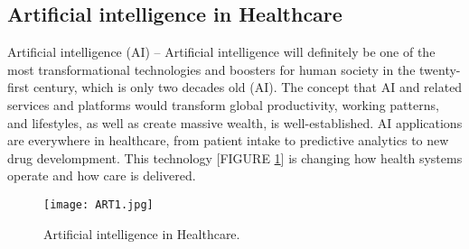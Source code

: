 \documentclass[12pt]{article}
\begin{document}
\subsection{Artificial intelligence  in Healthcare}
Artificial intelligence (AI)  – Artificial intelligence will
definitely be one of the most transformational technologies and boosters for
human society in the twenty-first century, which is only two decades old
(AI). The concept that AI and related services and platforms would transform
global productivity, working patterns, and lifestyles, as well as create massive
wealth, is well-established. AI applications are everywhere in healthcare,
from patient intake to predictive analytics to new drug develompment. This
technology [FIGURE \ref{fig_ART1}] is changing how health systems operate and how
care is delivered.
\begin{figure}[h]
\centering
\texttt{[image: ART1.jpg]}
\caption{Artificial intelligence  in Healthcare.}
\label{fig_ART1}
\end{figure}
\end{document}
